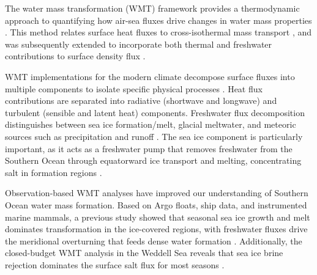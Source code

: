 \documentclass[pdflatex,sn-nature]{sn-jnl}
\begin{document}




The water mass transformation (WMT) framework provides a thermodynamic approach to quantifying how air-sea fluxes drive changes in water mass properties \cite{Walin1982,Groeskamp2019,drake2025water}. This method relates surface heat fluxes to cross-isothermal mass transport \cite{Walin1982}, and was subsequently extended  to incorporate both thermal and freshwater contributions to surface density flux \cite{Speer1992}.

WMT implementations for the modern climate decompose surface fluxes into multiple components to isolate specific physical processes \cite{Iudicone2008a,Iudicone2008b}. Heat flux contributions are separated into radiative (shortwave and longwave) and turbulent (sensible and latent heat) components. Freshwater flux decomposition distinguishes between sea ice formation/melt, glacial meltwater, and meteoric sources such as precipitation and runoff \cite{Abernathey2016,Bailey2023}. The sea ice component is particularly important, as it acts as a freshwater pump that removes freshwater from the Southern Ocean through equatorward ice transport and melting, concentrating salt in formation regions \cite{Abernathey2016}.

Observation-based WMT analyses have improved our understanding of Southern Ocean water mass formation.  Based on Argo floats, ship data, and instrumented marine mammals, a previous study showed that seasonal sea ice growth and melt dominates transformation in the ice-covered regions, with freshwater fluxes drive the meridional overturning that feeds dense water formation \cite{Pellichero2018}. Additionally, the closed-budget WMT analysis in the Weddell Sea reveals that sea ice brine rejection dominates the surface salt flux for most seasons \cite{Bailey2023}.
\end{document}
